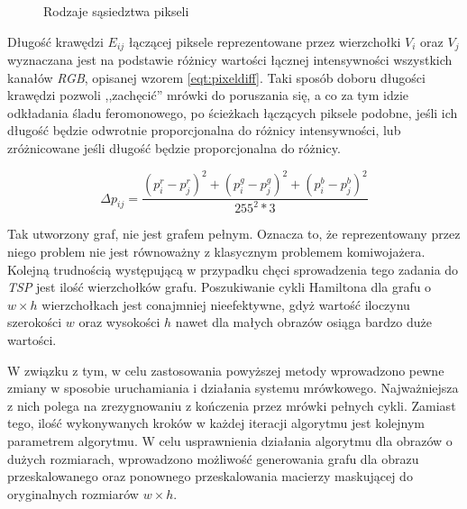 {{{\begin{figure}
                \caption[Rodzaje sąsiedztwa]
                {Rodzaje sąsiedztwa pikseli}
                \label{fig:neighbors}
            \end{figure}

            Długość krawędzi $E_{ij}$ łączącej piksele reprezentowane przez wierzchołki $V_i$ oraz $V_j$ wyznaczana jest
            na podstawie różnicy wartości łącznej intensywności wszystkich kanałów \textit{RGB}, opisanej wzorem
            \ref{eqt:pixeldiff}. Taki sposób doboru długości krawędzi pozwoli ,,zachęcić'' mrówki do poruszania się, a
            co za tym idzie odkładania śladu feromonowego, po ścieżkach łączących piksele podobne, jeśli ich długość
            będzie odwrotnie proporcjonalna do różnicy intensywności, lub zróżnicowane jeśli długość będzie
            proporcjonalna do różnicy.

            \begin{equation}\label{eqt:pixeldiff}
                \Delta p_{ij} = \frac{(p_i^r - p_j^r)^2 + (p_i^g - p_j^g)^2 + (p_i^b - p_j^b)^2}{255^2 * 3}
            \end{equation}

            Tak utworzony graf, nie jest grafem pełnym. Oznacza to, że reprezentowany przez niego problem nie jest
            równoważny z klasycznym problemem komiwojażera. Kolejną trudnością występującą w przypadku chęci
            sprowadzenia tego zadania do \textit{TSP} jest ilość wierzchołków grafu. Poszukiwanie cykli Hamiltona dla
            grafu o $w \times h$ wierzchołkach jest conajmniej nieefektywne, gdyż wartość iloczynu szerokości $w$ oraz
            wysokości $h$ nawet dla małych obrazów osiąga bardzo duże wartości.

            W związku z tym, w celu zastosowania powyższej metody wprowadzono pewne zmiany w sposobie uruchamiania i
            działania systemu mrówkowego. Najważniejsza z nich polega na zrezygnowaniu z kończenia przez mrówki pełnych
            cykli. Zamiast tego, ilość wykonywanych kroków w każdej iteracji algorytmu jest kolejnym parametrem
            algorytmu. W celu usprawnienia działania algorytmu dla obrazów o dużych rozmiarach, wprowadzono
            możliwość generowania grafu dla obrazu przeskalowanego oraz ponownego przeskalowania macierzy maskującej do
            oryginalnych rozmiarów $w \times h$.

}}}
